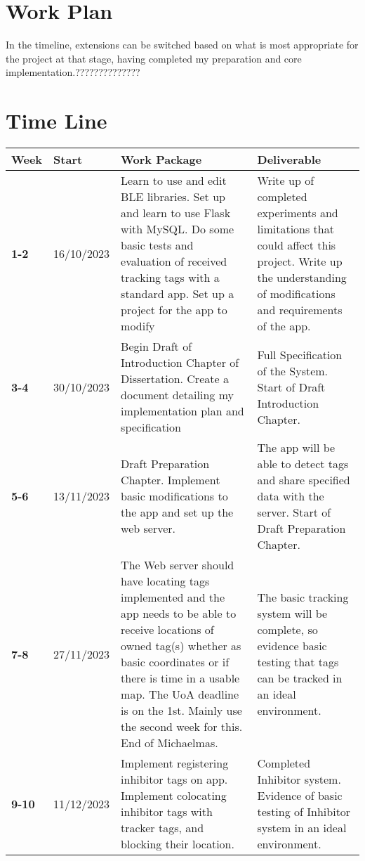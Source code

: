\documentclass{article}
\begin{document}
\section{Work Plan}

In the timeline, extensions can be switched based on what is most appropriate for the project at that stage, having completed my preparation and core implementation.??????????????

\pagebreak
\section{Time Line}
\begin{table}[!ht]
\raggedleft
\begin{tabular}{|l|l|p{7cm}|p{7cm}|}
\hline
\textbf{Week} & \textbf{Start} & \textbf{Work Package} & \textbf{Deliverable} \\ \hline
\textbf{1-2} & 16/10/2023 & Learn to use and edit BLE libraries. Set up and learn to use Flask with MySQL. Do some basic tests and evaluation of received tracking tags with a standard app. Set up a project for the app to modify & Write up of completed experiments and limitations that could affect this project. Write up the understanding of modifications and requirements of the app. \\ \hline
\textbf{3-4} & 30/10/2023 & Begin Draft of Introduction Chapter of Dissertation. Create a document detailing my implementation plan and specification & Full Specification of the System. Start of Draft Introduction Chapter. \\ \hline
\textbf{5-6} & 13/11/2023 & Draft Preparation Chapter. Implement basic modifications to the app and set up the web server. & The app will be able to detect tags and share specified data with the server. Start of Draft Preparation Chapter. \\ \hline
\textbf{7-8} & 27/11/2023 & The Web server should have locating tags implemented and the app needs to be able to receive locations of owned tag(s) whether as basic coordinates or if there is time in a usable map. The UoA deadline is on the 1st. Mainly use the second week for this. End of Michaelmas. & The basic tracking system will be complete, so evidence basic testing that tags can be tracked in an ideal environment. \\ \hline
\textbf{9-10} & 11/12/2023 & Implement registering inhibitor tags on app. Implement colocating inhibitor tags with tracker tags, and blocking their location. & Completed Inhibitor system. Evidence of basic testing of Inhibitor system in an ideal environment. \\ \hline

\end{tabular}
\end{table}
\end{document}
